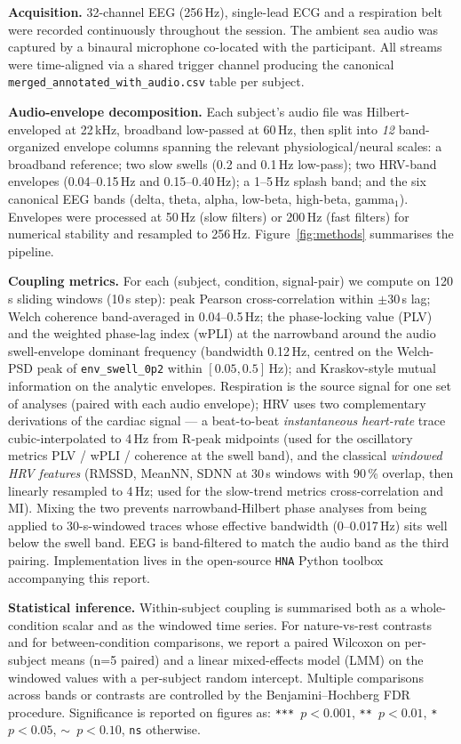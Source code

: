 \documentclass[11pt,a4paper]{article}
\begin{document}
\textbf{Acquisition.} 32-channel EEG (256\,Hz), single-lead ECG and a
respiration belt were recorded continuously throughout the session. The
ambient sea audio was captured by a binaural microphone co-located with
the participant. All streams were time-aligned via a shared trigger channel
producing the canonical \texttt{merged\_annotated\_with\_audio.csv} table
per subject.

\textbf{Audio-envelope decomposition.} Each subject's audio file was
Hilbert-enveloped at 22\,kHz, broadband low-passed at 60\,Hz, then split into
\emph{12} band-organized envelope columns spanning the relevant
physiological/neural scales: a broadband reference; two slow swells (0.2 and
0.1\,Hz low-pass); two HRV-band envelopes (0.04--0.15\,Hz and 0.15--0.40\,Hz);
a 1--5\,Hz splash band; and the six canonical EEG bands (delta, theta, alpha,
low-beta, high-beta, gamma$_1$). Envelopes were processed at 50\,Hz (slow
filters) or 200\,Hz (fast filters) for numerical stability and resampled to
256\,Hz. Figure~\ref{fig:methods} summarises the pipeline.

\textbf{Coupling metrics.} For each (subject, condition, signal-pair) we
compute on 120\,s sliding windows (10\,s step): peak Pearson cross-correlation
within $\pm 30$\,s lag; Welch coherence band-averaged in 0.04--0.5\,Hz; the
phase-locking value (PLV) and the weighted phase-lag index (wPLI) at the
narrowband around the audio swell-envelope dominant frequency (bandwidth
0.12\,Hz, centred on the Welch-PSD peak of \texttt{env\_swell\_0p2} within
$[0.05, 0.5]$\,Hz); and Kraskov-style mutual information on the analytic
envelopes. Respiration is the source signal for one set of analyses
(paired with each audio envelope); HRV uses two complementary derivations
of the cardiac signal --- a beat-to-beat \emph{instantaneous heart-rate}
trace cubic-interpolated to 4\,Hz from R-peak midpoints (used for the
oscillatory metrics PLV / wPLI / coherence at the swell band), and the
classical \emph{windowed HRV features} (RMSSD, MeanNN, SDNN at 30\,s
windows with 90\,\% overlap, then linearly resampled to 4\,Hz; used for
the slow-trend metrics cross-correlation and MI). Mixing the two
prevents narrowband-Hilbert phase analyses from being applied to
30-s-windowed traces whose effective bandwidth (0--0.017\,Hz) sits well
below the swell band. EEG is band-filtered to match the audio band as
the third pairing. Implementation lives in the open-source
\texttt{HNA} Python toolbox accompanying this report.

\textbf{Statistical inference.} Within-subject coupling is summarised both as
a whole-condition scalar and as the windowed time series. For nature-vs-rest
contrasts and for between-condition comparisons, we report a paired Wilcoxon
on per-subject means (n=5 paired) and a linear mixed-effects model (LMM) on
the windowed values with a per-subject random intercept. Multiple
comparisons across bands or contrasts are controlled by the
Benjamini--Hochberg FDR procedure. Significance is reported
on figures as: \texttt{*** $p\!<\!0.001$}, \texttt{** $p\!<\!0.01$},
\texttt{* $p\!<\!0.05$}, \texttt{$\sim$ $p\!<\!0.10$}, \texttt{ns} otherwise.
\end{document}
